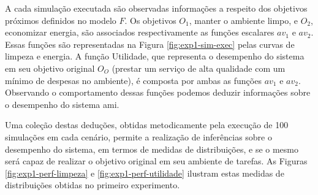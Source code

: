 \begin{figure}[h!]
    \centering
\end{figure}

A cada simulação executada são observadas informações a respeito dos objetivos próximos definidos no modelo $F$. Os objetivos $O_1$, manter o ambiente limpo, e $O_2$, economizar energia, são associados respectivamente as funções escalares $av_1$ e $av_2$. Essas funções são representadas na Figura \ref{fig:exp1-sim-exec} pelas curvas de limpeza e energia. A função Utilidade, que representa o desempenho do sistema em seu objetivo original $O_O$ (prestar um serviço de alta qualidade com um mínimo de despesas no ambiente), é composta por ambas as funções $av_1$ e $av_2$. Observando o comportamento dessas funções podemos deduzir informações sobre o desempenho do sistema \acrshort{ami}.

Uma coleção destas deduções, obtidas metodicamente pela execução de 100 simulações em cada cenário, permite a realização de inferências sobre o desempenho do sistema, em termos de medidas de distribuições, e se o mesmo será capaz de realizar o objetivo original em seu ambiente de tarefas. As Figuras \ref{fig:exp1-perf-limpeza} e \ref{fig:exp1-perf-utilidade} ilustram estas medidas de distribuições obtidas no primeiro experimento. 

\begin{figure}[h!]
    \centering
\end{figure}

